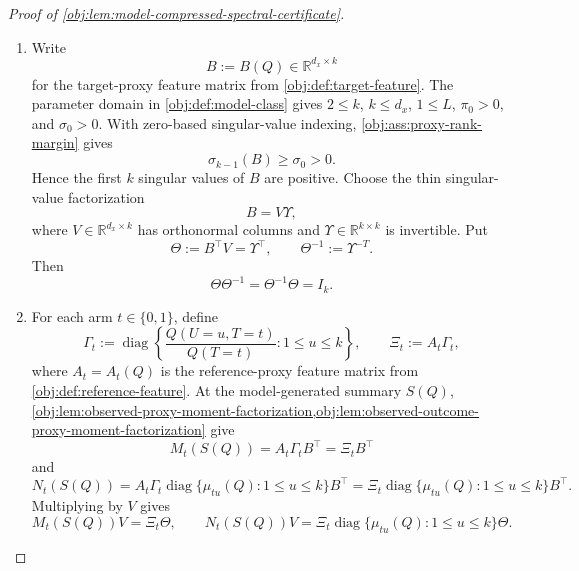 \documentclass[11pt]{article}
\begin{document}
\begin{proof}[Proof of \cref{obj:lem:model-compressed-spectral-certificate}]
\begin{enumerate}
\item
Write
\[
B:=B(Q)\in\mathbb R^{d_x\times k}
\]
for the target-proxy feature matrix from \cref{obj:def:target-feature}.  The parameter domain in \cref{obj:def:model-class} gives \(2\le k\), \(k\le d_x\), \(1\le L\), \(\pi_0>0\), and \(\sigma_0>0\).  With zero-based singular-value indexing, \cref{obj:ass:proxy-rank-margin} gives
\[
\sigma_{k-1}(B)\ge \sigma_0>0 .
\]
Hence the first \(k\) singular values of \(B\) are positive.  Choose the thin singular-value factorization
\[
B=V\Upsilon ,
\]
where \(V\in\mathbb R^{d_x\times k}\) has orthonormal columns and \(\Upsilon\in\mathbb R^{k\times k}\) is invertible.  Put
\[
\Theta:=B^\top V=\Upsilon^\top,
\qquad
\Theta^{-1}:=\Upsilon^{-T}.
\]
Then
\[
\Theta\Theta^{-1}=\Theta^{-1}\Theta=I_k .
\]

\item
For each arm \(t\in\{0,1\}\), define
\[
\Gamma_t
:=
\operatorname{diag}\left\{
\frac{Q(U=u,T=t)}{Q(T=t)}:1\le u\le k
\right\},
\qquad
\Xi_t:=A_t\Gamma_t ,
\]
where \(A_t=A_t(Q)\) is the reference-proxy feature matrix from \cref{obj:def:reference-feature}.  At the model-generated summary \(S(Q)\), \cref{obj:lem:observed-proxy-moment-factorization,obj:lem:observed-outcome-proxy-moment-factorization} give
\[
M_t(S(Q))=A_t\Gamma_tB^\top=\Xi_tB^\top
\]
and
\[
N_t(S(Q))
=
A_t\Gamma_t\operatorname{diag}\{\mu_{tu}(Q):1\le u\le k\}B^\top
=
\Xi_t\operatorname{diag}\{\mu_{tu}(Q):1\le u\le k\}B^\top .
\]
Multiplying by \(V\) gives
\[
M_t(S(Q))V=\Xi_t\Theta,
\qquad
N_t(S(Q))V
=
\Xi_t\operatorname{diag}\{\mu_{tu}(Q):1\le u\le k\}\Theta .
\]


\end{enumerate}
\end{proof}
\end{document}

